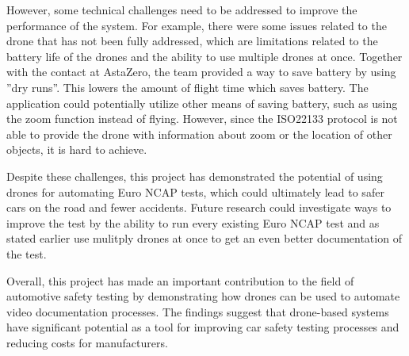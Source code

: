 
However, some technical challenges need to be addressed to improve the performance of the system. For example, there were some issues related to the drone that has not been fully addressed, which are limitations related to the battery life of the drones and the ability to use multiple drones at once. Together with the contact at AstaZero, the team provided a way to save battery by using ''dry runs''. This lowers the amount of flight time which saves battery. The application could potentially utilize other means of saving battery, such as using the zoom function instead of flying. However, since the ISO22133 protocol is not able to provide the drone with information about zoom or the location of other objects, it is hard to achieve.\newline

Despite these challenges, this project has demonstrated the potential of using drones for automating Euro NCAP tests, which could ultimately lead to safer cars on the road and fewer accidents. Future research could investigate ways to improve the test by the ability to run every existing Euro NCAP test and as stated earlier use mulitply drones at once to get an even better documentation of the test.\newline

Overall, this project has made an important contribution to the field of automotive safety testing by demonstrating how drones can be used to automate video documentation processes. The findings suggest that drone-based systems have significant potential as a tool for improving car safety testing processes and reducing costs for manufacturers.